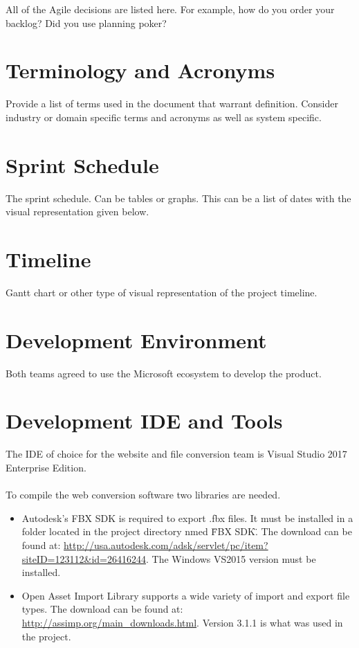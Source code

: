All of the Agile decisions are listed here.  For example, how do you order your backlog?   
Did you use planning poker?   

\section{Terminology and Acronyms}
Provide a list of terms used in the document that warrant definition.  Consider 
industry or domain specific terms and acronyms as well as system specific. 

\section{Sprint Schedule}
The sprint schedule.  Can be tables or graphs.   This can be a list of dates with the visual 
representation given below.

\section{Timeline}
Gantt chart or other type of visual representation of the project timeline.

\section{Development Environment}
Both teams agreed to use the Microsoft ecosystem to develop the product.

\section{Development IDE and Tools}

The IDE of choice for the website and file conversion team is Visual Studio 2017 Enterprise Edition.

\paragraph{}
To compile the web conversion software two libraries are needed.
\begin{itemize}
    \item Autodesk's FBX SDK is required to export .fbx files.  It must be installed in a folder located in the project directory nmed \"FBX SDK\".  The download can be found at: 
    \url{http://usa.autodesk.com/adsk/servlet/pc/item?siteID=123112&id=26416244}.
    The Windows VS2015 version must be installed.
    
    \item Open Asset Import Library supports a wide variety of import and export file types.  The download can be found at: \url{http://assimp.org/main_downloads.html}.  Version 3.1.1 is what was used in the project. 
\end{itemize}

